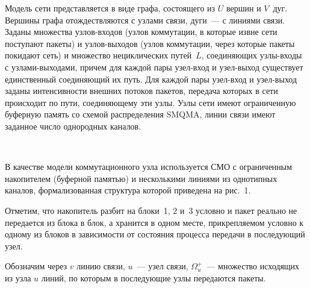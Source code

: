 \begin{multicols}{2}
     Модель сети представляется в виде графа, состоящего из $U$ вершин и 
$V$~дуг. Вершины графа отождествляются с узлами связи, дуги~--- с 
линиями связи. Заданы множества узлов-входов (узлов коммутации, в 
которые извне сети поступают пакеты) и узлов-выходов (узлов коммутации, 
через которые пакеты покидают сеть) и множество нециклических 
путей~$L$, соединяющих узлы-входы с уз\-ла\-ми-выходами, причем для 
каждой пары узел-вход и узел-выход существует единственный 
соединяющий их путь. Для каждой пары узел-вход и узел-выход заданы 
интенсивности внешних потоков пакетов, передача которых в сети 
происходит по пути, соединяющему эти узлы. Узлы сети имеют 
ограниченную буферную память со схемой распределения SMQMA, линии 
связи имеют заданное число однородных каналов. 

\begin{figure*} %
\vspace*{1pt}
 \begin{center}
 \mbox{%
 \epsfxsize=132.345mm
 }
 \end{center}
 \vspace*{-9pt}
\end{figure*}

     В качестве модели коммутационного узла используется СМО 
     с ограниченным накопителем (буферной памятью) 
и несколькими линиями из однотипных каналов, формализованная структура 
которой приведена на рис.~1. 

  
  Отметим, что накопитель разбит на блоки~1, 2 и~3 условно и пакет 
реально не передается из блока в блок, а хранится в одном месте, 
прикрепляемом условно к одному из блоков в зависимости от состояния 
процесса передачи в последующий узел. 
     
     Обозначим через $v$ линию связи, $u$~--- узел связи, 
     $\Omega_u^+$~--- множество исходящих из узла $u$ линий, по 
которым в последующие узлы передаются пакеты.
  

\end{multicols}
